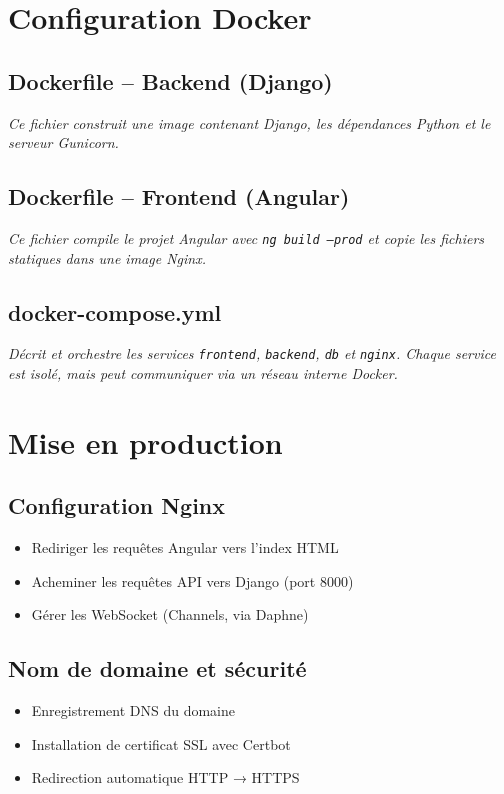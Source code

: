 \section{Configuration Docker}

\subsection*{Dockerfile – Backend (Django)}
\textit{Ce fichier construit une image contenant Django, les dépendances Python et le serveur Gunicorn.}

\subsection*{Dockerfile – Frontend (Angular)}
\textit{Ce fichier compile le projet Angular avec \texttt{ng build --prod} et copie les fichiers statiques dans une image Nginx.}

\subsection*{docker-compose.yml}
\textit{Décrit et orchestre les services \texttt{frontend}, \texttt{backend}, \texttt{db} et \texttt{nginx}. Chaque service est isolé, mais peut communiquer via un réseau interne Docker.}

\section{Mise en production}

\subsection*{Configuration Nginx}
\begin{itemize}
  \item Rediriger les requêtes Angular vers l’index HTML
  \item Acheminer les requêtes API vers Django (port 8000)
  \item Gérer les WebSocket (Channels, via Daphne)
\end{itemize}

\subsection*{Nom de domaine et sécurité}
\begin{itemize}
  \item Enregistrement DNS du domaine
  \item Installation de certificat SSL avec Certbot
  \item Redirection automatique HTTP → HTTPS
\end{itemize}

